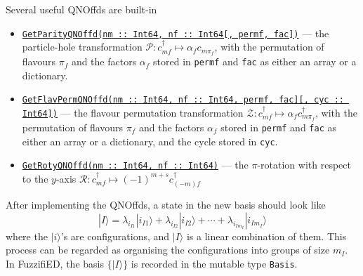 \documentclass{timesjhep}
\begin{document}
Several useful QNOffds are built-in
\begin{itemize}
    \item \href{https://docs.fuzzified.world/models/\#FuzzifiED.GetParityQNOffd}{\lstinline|GetParityQNOffd(nm :: Int64, nf :: Int64[, permf, fac])|} --- the particle-hole transformation $\mathcal{P}:c^\dagger_{mf}\mapsto\alpha_fc_{m\pi_f}$, with the permutation of flavours $\pi_f$ and the factors $\alpha_f$ stored in \lstinline|permf| and \lstinline|fac| as either an array or a dictionary. 
    \item \href{https://docs.fuzzified.world/models/\#FuzzifiED.GetFlavPermQNOffd}{\lstinline|GetFlavPermQNOffd(nm :: Int64, nf :: Int64, permf, fac][, cyc :: Int64])|} --- the flavour permutation transformation $\mathcal{Z}:c^\dagger_{mf}\mapsto\alpha_fc_{m\pi_f}^\dagger$, with the permutation of flavours $\pi_f$ and the factors $\alpha_f$ stored in \lstinline|permf| and \lstinline|fac| as either an array or a dictionary, and the cycle stored in \lstinline|cyc|. 
    \item \href{https://docs.fuzzified.world/models/\#FuzzifiED.GetRotyQNOffd-Tuple{Int64,\%20Int64}}{\lstinline|GetRotyQNOffd(nm :: Int64, nf :: Int64)|} --- the $\pi$-rotation with respect to the $y$-axis $\mathcal{R}:c^\dagger_{mf}\mapsto(-1)^{m+s}c_{(-m)f}^\dagger$
\end{itemize}

After implementing the QNOffds, a state in the new basis should look like 
\begin{equation}
    |I\rangle=\lambda_{i_{I1}}|i_{I1}\rangle+\lambda_{i_{I2}}|i_{I2}\rangle+\cdots+\lambda_{i_{Im_I}}|i_{Im_I}\rangle
\end{equation}
where the $|i\rangle$'s are configurations, and $|I\rangle$ is a linear combination of them. This process can be regarded as organising the configurations into groups of size $m_I$. In FuzzifiED, the basis $\{|I\rangle\}$ is recorded in the mutable type \lstinline|Basis|. 
\end{document}
